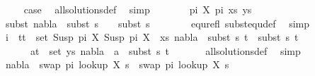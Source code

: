 \begin{isabellebody}
\ \ \ \isamarkupfalse%
\ {\isacharquery}{\kern0pt}case\ \isamarkupfalse%
\ all{\isacharunderscore}{\kern0pt}solutions{\isacharunderscore}{\kern0pt}def\ \isamarkupfalse%
\ simp\isanewline
\ \isamarkupfalse%
\isanewline
\ \ \ \isamarkupfalse%
\ {\isacharparenleft}{\kern0pt}{}\ pi{}\ X\ pi{}\ xs\ ys{\isacharparenright}{\kern0pt}\isanewline
\ \ \ \isamarkupfalse%
\ \isamarkupfalse%
\ subst{\isacharcolon}{\kern0pt}\ {\isachardoublequoteopen}nabla{}\ {\isasymTurnstile}\ subst\ {\isacharparenleft}{\kern0pt}s{}\ {\isasymbullet}\ {\isacharbrackleft}{\kern0pt}{\isacharbrackright}{\kern0pt}{\isacharparenright}{\kern0pt}\ {\isasymapprox}\ subst\ s{}{\isachardoublequoteclose}\ \isanewline
\ \ \ \ \ \isamarkupfalse%
\ equ{\isacharunderscore}{\kern0pt}refl\ subst{\isacharunderscore}{\kern0pt}equ{\isacharunderscore}{\kern0pt}def\ \isamarkupfalse%
\ simp\isanewline
\isanewline
\ \ \ \isamarkupfalse%
\ {}\isanewline
\ \ \ \isamarkupfalse%
\ i{\isacharcolon}{\kern0pt}\ {\isachardoublequoteopen}{\isasymforall}\ {\isacharparenleft}{\kern0pt}t{}{\isacharcomma}{\kern0pt}t{}{\isacharparenright}{\kern0pt}\ {\isasymin}\ set\ {\isacharparenleft}{\kern0pt}{\isacharparenleft}{\kern0pt}Susp\ pi{}\ X{\isacharcomma}{\kern0pt}\ Susp\ pi{}\ X{\isacharparenright}{\kern0pt}\ {\isacharhash}{\kern0pt}\ xs{\isacharparenright}{\kern0pt}{\isachardot}{\kern0pt}\ nabla{}\ {\isasymturnstile}\ subst\ s{}\ t{}\ {\isasymapprox}\ subst\ s{}\ t{}{\isachardoublequoteclose}\isanewline
\ \ \ \ \ {\isachardoublequoteopen}{\isasymforall}\ {\isacharparenleft}{\kern0pt}a{\isacharcomma}{\kern0pt}t{\isacharparenright}{\kern0pt}\ {\isasymin}\ set\ ys{\isachardot}{\kern0pt}\ nabla{}\ {\isasymturnstile}\ a\ {\isasymsharp}\ subst\ s{}\ t{\isachardoublequoteclose}\isanewline
\ \ \ \ \ \isamarkupfalse%
\ all{\isacharunderscore}{\kern0pt}solutions{\isacharunderscore}{\kern0pt}def\ \isamarkupfalse%
\ simp{\isacharplus}{\kern0pt}\isanewline
\isanewline
\isanewline
\ \ \ \isamarkupfalse%
\ {}{\isacharparenleft}{\kern0pt}{}{\isacharparenright}{\kern0pt}\isanewline
\ \ \ \isamarkupfalse%
\ {\isachardoublequoteopen}nabla{}\ {\isasymturnstile}\ swap\ pi{}\ {\isacharparenleft}{\kern0pt}look{\isacharunderscore}{\kern0pt}up\ X\ s{}{\isacharparenright}{\kern0pt}\ {\isasymapprox}\ swap\ pi{}\ {\isacharparenleft}{\kern0pt}look{\isacharunderscore}{\kern0pt}up\ X\ s{}{\isacharparenright}{\kern0pt}{\isachardoublequoteclose}\isanewline

\end{isabellebody}
